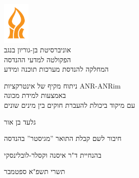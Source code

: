 \begin{titlepage}
    \begin{center}
        \vspace*{1cm}
        
        \includegraphics[width=0.1\textwidth]{bgu}\\
        אוניברסיטת בן-גוריון בנגב\\
        הפקולטה למדעי ההנדסה\\
        המחלקה להנדסת מערכות תוכנה ומידע
       
        \vspace{2cm}
        
        {\Large ניתוח מקיף של אינטרקציות ANR-ANRim\\ באמצעות למידת מכונה\\
        עם מיקוד ביכולת להעברת חוקים בין מינים שונים
      }
        
        \vspace{1.5cm}

        גלעד בן אור
        \vspace{1cm}
        
        חיבור לשם קבלת התואר ''מגיסטר'' בהנדסה
        
        \vspace{1cm}
        
        בהנחיית ד"ר איסנה וקסלר-לובלינסקי
        
        \vfill
        
        תשרי תשפ"א  \hfill  ספטמבר    { \endL}  
        
        
    \end{center}
\end{titlepage}